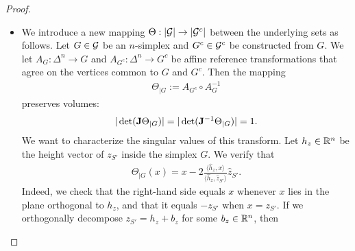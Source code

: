 \documentclass[10pt,a4paper]{article}
\begin{document}
\begin{proof}
\begin{itemize}
        
        \item 
        We introduce a new mapping $\Theta : \left| {\mathcal G} \right| \rightarrow \left| {\mathcal G}^c \right|$ between the underlying sets as follows.
        Let $G \in {\mathcal G}$ be an $n$-simplex and $G^{c} \in {\mathcal G}^{c}$ be constructed from $G$.
        We let $A_{G} : \Delta^{n} \rightarrow G$ and $A_{G^{c}} : \Delta^{n} \rightarrow G^{c}$
        be affine reference transformations
        that agree on the vertices common to $G$ and $G^{c}$.
        Then the mapping 
        \begin{align*}
            \Theta_{|G} := A_{G^{c}} \circ A_{G}^{-1}
        \end{align*}
        preserves volumes:
        \begin{align*}
            |\det( {\mathbf{J}}      \Theta_{|G} )|
            = 
            |\det( {\mathbf{J}}^{-1} \Theta_{|G} )|
            =
            1
            .
        \end{align*}
        We want to characterize the singular values of this transform. 
        Let $h_{z} \in {\mathbb R}^{n}$ be the height vector of $z_{S'}$ inside the simplex $G$.
        We verify that 
        \begin{align*}
            \Theta_{|G}(x) 
            = 
            x
            - 
            2 \frac{\langle \hat h_{z}, x \rangle}{\langle \hat h_{z}, \hat z_{S'} \rangle}
            \hat z_{S'}
            .
        \end{align*}
        Indeed, we check that the right-hand side equals $x$ whenever $x$ lies in the plane orthogonal to $h_{z}$,
        and that it equals $-z_{S'}$ when $x = z_{S'}$.
        If we orthogonally decompose $z_{S'} = h_{z} + b_{z}$ for some $b_{z} \in {\mathbb R}^{n}$, then 

\end{itemize}
\end{proof}
\end{document}

